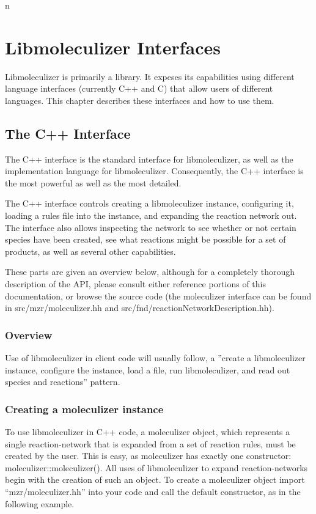 n\chapter{Libmoleculizer Interfaces}
\label{chap:interfacesChapter}

Libmoleculizer is primarily a library.  It expeses its capabilities
using different language interfaces (currently C++ and C) that allow
users of different languages.  This chapter describes these
interfaces and how to use them.

\section{The C++ Interface}
The C++ interface is the standard interface for libmoleculizer, as
well as the implementation language for libmoleculizer.  Consequently,
the C++ interface is the most powerful as well as the most detailed.

The C++ interface controls creating a libmoleculizer instance,
configuring it, loading a rules file into the instance, and expanding
the reaction network out.  The interface also allows inspecting the
network to see whether or not certain species have been created, see
what reactions might be possible for a set of products, as well as
several other capabilities.  

These parts are given an overview below, although for a completely
thorough description of the API, please consult either reference
portions of this documentation, or browse the source code (the
moleculizer interface can be found in src/mzr/moleculizer.hh and
src/fnd/reactionNetworkDescription.hh).

\subsection{Overview}
Use of libmoleculizer in client code will usually follow, a ''create a
libmoleculizer instance, configure the instance, load a file, run
libmoleculizer, and read out species and reactions'' pattern.  

\subsection{Creating a moleculizer instance}
To use libmoleculizer in C++ code, a moleculizer object, which
represents a single reaction-network that is expanded from a set of
reaction rules, must be created by the user. This is easy, as
moleculizer has exactly one constructor: moleculizer::moleculizer().
All uses of libmoleculizer to expand reaction-networks begin with the
creation of such an object.  To create a moleculizer object import
``mzr/moleculizer.hh''  into your code and call the default
constructor, as in the following example.  

